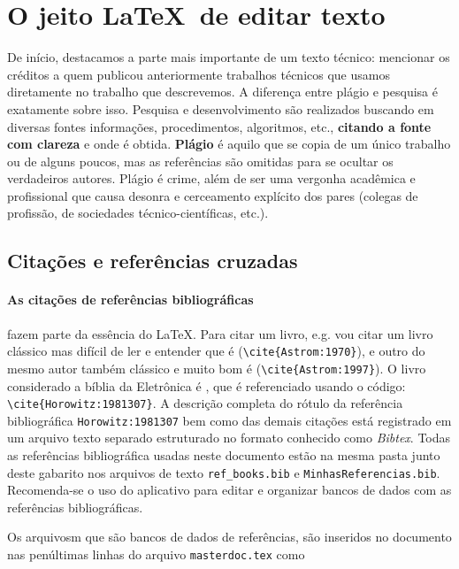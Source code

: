 \section{O jeito \LaTeX\ de editar texto}

De início, destacamos a parte mais importante de um texto técnico: mencionar os créditos a quem publicou anteriormente trabalhos técnicos que usamos diretamente no trabalho que descrevemos. A diferença entre plágio e pesquisa é exatamente sobre isso. Pesquisa e desenvolvimento são realizados  buscando em diversas fontes  informações, procedimentos, algoritmos, etc., \textbf{citando a fonte com clareza} e onde é  obtida. \textbf{Plágio} é aquilo que se copia de um único trabalho ou de alguns poucos, mas as referências são omitidas para se ocultar os verdadeiros autores. Plágio é crime, além de ser uma vergonha acadêmica e profissional que causa desonra e cerceamento explícito dos pares (colegas de profissão, de sociedades técnico-científicas, etc.).

\subsection{Citações e referências cruzadas} 

\paragraph{As citações de referências bibliográficas} fazem parte da essência do \LaTeX. Para citar um livro, e.g. vou citar um livro clássico mas difícil de ler e entender que é \cite{Astrom:1970} (\verb|\cite{Astrom:1970}|), e outro do mesmo autor também clássico e muito bom é \cite{Astrom:1997} (\verb|\cite{Astrom:1997}|). O livro considerado a bíblia da Eletrônica é \cite{Horowitz:1981307}, que é referenciado usando o código: \verb|\cite{Horowitz:1981307}|.  A descrição completa do rótulo da referência bibliográfica  \texttt{Horowitz:1981307} bem como das demais citações está registrado em um arquivo texto separado estruturado no formato conhecido como \emph{Bibtex}.  Todas as referências bibliográfica usadas neste documento estão na mesma pasta junto deste gabarito  nos arquivos de texto \verb|ref_books.bib| e \verb|MinhasReferencias.bib|. Recomenda-se o uso do aplicativo \cite{JabRef2021} para editar e organizar bancos de dados com as referências bibliográficas.  

Os arquivosm que são bancos de dados de referências, são inseridos no documento nas penúltimas linhas do arquivo \texttt{masterdoc.tex} como 

